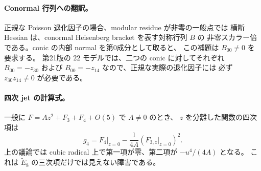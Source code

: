 \paragraph{Conormal 行列への翻訳。}
正規な Poisson 退化因子の場合、modular residue が非零の一般点では
横断 Hessian は、conormal Heisenberg bracket を表す対称行列 $B$ の
非零スカラー倍である。conic の内部 normal を第0成分として取ると、
この補題は $B_{00}\ne0$ を要求する。
第21版の $22$ モデルでは、二つの conic に対してそれぞれ
$B_{00}=-z_{30}$ および $B_{00}=-z_{14}$ なので、正規な実際の退化因子には
必ず $z_{30}z_{14}\ne0$ が必要である。

\paragraph{四次 jet の計算式。}
一般に $F=Az^2+F_3+F_4+O(5)$ で $A\ne0$ のとき、
$z$ を分離した関数の四次項は
\[
 g_4=F_4|_{z=0}-\frac{1}{4A}\left(F_{3,z}|_{z=0}\right)^2.
\]
上の議論では cubic radical 上で第一項が零、第二項が $-u^4/(4A)$ となる。
これは $\widetilde E_8$ の三次項だけでは見えない障害である。
